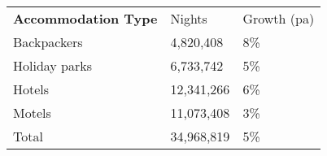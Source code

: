 \begin{tabular}[t]{p{4.8cm}>{\hfill}p{1.3cm}>{\hfill}p{1.4cm}}
 \textbf{Accommodation Type} & Nights & Growth (pa) \\ 
 Backpackers &  4,820,408 & 8\% \\ 
  Holiday parks &  6,733,742 & 5\% \\ 
  Hotels & 12,341,266 & 6\% \\ 
  Motels & 11,073,408 & 3\% \\ 
  Total & 34,968,819 & 5\% \\ 
  \end{tabular}
